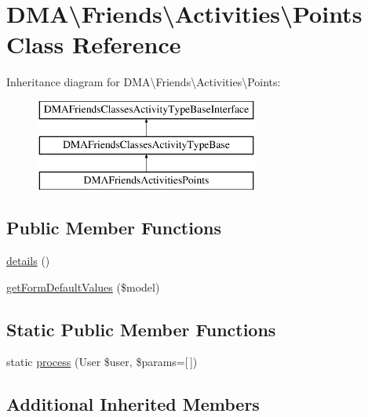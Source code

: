 \hypertarget{classDMA_1_1Friends_1_1Activities_1_1Points}{}\section{D\+M\+A\textbackslash{}Friends\textbackslash{}Activities\textbackslash{}Points Class Reference}
\label{classDMA_1_1Friends_1_1Activities_1_1Points}
Inheritance diagram for D\+M\+A\textbackslash{}Friends\textbackslash{}Activities\textbackslash{}Points\+:\begin{figure}[H]
\begin{center}
\leavevmode
\includegraphics[height=3.000000cm]{d4/d26/classDMA_1_1Friends_1_1Activities_1_1Points}
\end{center}
\end{figure}
\subsection*{Public Member Functions}
\begin{DoxyCompactItemize}
\item 
\hyperlink{classDMA_1_1Friends_1_1Activities_1_1Points_a4e7b1a57e908b49374b05567d6469186}{details} ()
\item 
\hyperlink{classDMA_1_1Friends_1_1Activities_1_1Points_aee8b900cbd3e02a623e6661d021944d4}{get\+Form\+Default\+Values} (\$model)
\end{DoxyCompactItemize}
\subsection*{Static Public Member Functions}
\begin{DoxyCompactItemize}
\item 
static \hyperlink{classDMA_1_1Friends_1_1Activities_1_1Points_a5822192344843b5a1948a8cbc737223d}{process} (User \$user, \$params=\mbox{[}$\,$\mbox{]})
\end{DoxyCompactItemize}
\subsection*{Additional Inherited Members}


